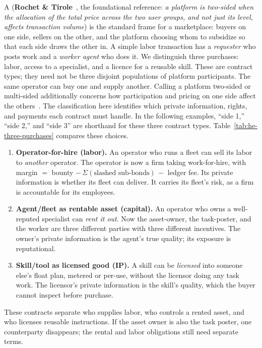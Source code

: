 \documentclass[11pt,a4paper]{article}
\theoremstyle{definition}
\theoremstyle{definition}
\theoremstyle{remark}
\begin{document}
A  (\textbf{Rochet \& Tirole}~, the
foundational reference: \emph{a platform is two-sided when the allocation of the
total price across the two user groups, and not just its level, affects
transaction volume}) is the standard frame for a marketplace: buyers on one side,
sellers on the other, and the platform choosing whom to subsidize so that each
side draws the other in. A simple labor transaction has a \emph{requester} who
posts work and a \emph{worker agent} who does it.
We distinguish three purchases: labor, access to a specialist, and a licence
for a reusable skill. These are contract types; they need not be three disjoint
populations of platform participants. The same operator can buy one and supply
another. Calling a platform two-sided or multi-sided additionally concerns how
participation and pricing on one side affect the others~.
The classification here identifies which private information, rights, and
payments each contract must handle. In the following examples, ``side 1,''
``side 2,'' and ``side 3'' are shorthand for these three contract types. Table~\ref{tab:he-three-purchases}
compares these choices.
\begin{enumerate}[leftmargin=1.6em,itemsep=4pt]
  \item \textbf{Operator-for-hire (labor).} An operator who runs a fleet can sell
    its labor to \emph{another} operator. The operator is now a firm taking
    work-for-hire, with margin $=$ bounty $-\,\Sigma(\text{slashed sub-bonds})\,-$
    ledger fee. Its private information is whether its fleet can deliver. It
    carries its fleet's risk, as a firm is accountable for its employees.
  \item \textbf{Agent/fleet as rentable asset (capital).} An operator who owns a
    well-reputed specialist can \emph{rent it out}. Now the asset-owner, the
    task-poster, and the worker are three different parties with three different
    incentives. The owner's private information is the agent's true quality; its
    exposure is reputational.
  \item \ifpdmargincolumn{}\fi%
    \textbf{Skill/tool as licensed good (IP).} A skill can be \emph{licensed}
    into someone else's float plan, metered or per-use, without the licensor
    doing any task work. The licensor's private information is the skill's quality,
    which the buyer cannot inspect before purchase.
\end{enumerate}
These contracts separate who supplies labor, who controls a rented asset,
and who licenses reusable instructions. If the asset owner is also the task
poster, one counterparty disappears; the rental and labor obligations still
need separate terms.

\end{document}
